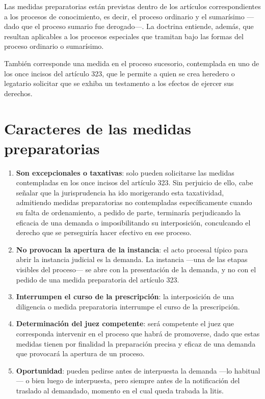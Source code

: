\documentclass[12pt,oneside]{book}
\begin{document}
Las medidas preparatorias están previstas dentro de los artículos correspondientes a los procesos de conocimiento, es decir, el proceso ordinario y el sumarísimo —dado que el proceso sumario fue derogado—. La doctrina entiende, además, que resultan aplicables a los procesos especiales que tramitan bajo las formas del proceso ordinario o sumarísimo.

También corresponde una medida en el proceso sucesorio, contemplada en uno de los once incisos del artículo 323, que le permite a quien se crea heredero o legatario solicitar que se exhiba un testamento a los efectos de ejercer sus derechos.

\section{Caracteres de las medidas preparatorias}

\begin{enumerate}[label=\alph*)]
    \item \textbf{Son excepcionales o taxativas}: solo pueden solicitarse las medidas contempladas en los once incisos del artículo 323. Sin perjuicio de ello, cabe señalar que la jurisprudencia ha ido morigerando esta taxatividad, admitiendo medidas preparatorias no contempladas específicamente cuando su falta de ordenamiento, a pedido de parte, terminaría perjudicando la eficacia de una demanda o imposibilitando su interposición, conculcando el derecho que se perseguiría hacer efectivo en ese proceso.
    \item \textbf{No provocan la apertura de la instancia}: el acto procesal típico para abrir la instancia judicial es la demanda. La instancia —una de las etapas visibles del proceso— se abre con la presentación de la demanda, y no con el pedido de una medida preparatoria del artículo 323.
    \item \textbf{Interrumpen el curso de la prescripción}: la interposición de una diligencia o medida preparatoria interrumpe el curso de la prescripción.
    \item \textbf{Determinación del juez competente}: será competente el juez que corresponda intervenir en el proceso que habrá de promoverse, dado que estas medidas tienen por finalidad la preparación precisa y eficaz de una demanda que provocará la apertura de un proceso.
    \item \textbf{Oportunidad}: pueden pedirse antes de interpuesta la demanda —lo habitual— o bien luego de interpuesta, pero siempre antes de la notificación del traslado al demandado, momento en el cual queda trabada la litis.
\end{enumerate}
\end{document}
